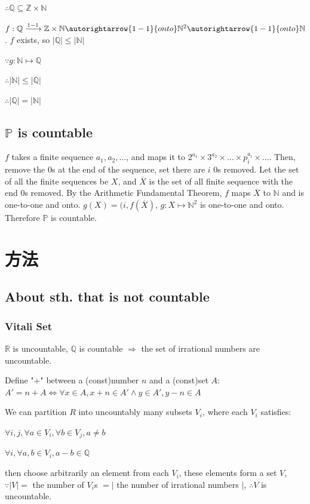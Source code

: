 \documentclass[12pt,a4paper]{ctexrep}
\begin{document}
$\therefore \mathbb{Q} \subseteq \mathbb{Z}\times \mathbb{N}$

$f: \mathbb{Q}\xrightarrow{1-1}\mathbb{Z}\times\mathbb{N}\autorightarrow{1-1}{onto}\mathbb{N}^2\autorightarrow{1-1}{onto}\mathbb{N}$. $f$ exists, so $|\mathbb{Q}|\leqslant|\mathbb{N}|$

$\because g:\mathbb{N}\mapsto \mathbb{Q}$

$\therefore |\mathbb{N}|\leqslant|\mathbb{Q}|$

$\therefore |\mathbb{Q}| = |\mathbb{N}|$
\subsection{$\mathbb{P}$ is countable}
$f$ takes a finite sequence $a_1,a_2,\dots$, and maps it to $2^{a_1}\times3^{a_2}\times\dots\times p_i^{a_i} \times\dots$. Then, remove the 0s at the end of the sequence, set there are $i$ 0s removed. Let the set of all the finite sequences be $X$, and $\overline{X}$ is the set of all finite sequence with the end 0s removed. By the Arithmetic Fundamental Theorem, $f$ maps $\overline{X}$ to $\mathbb{N}$ and is one-to-one and onto. $g(X) = (i,f(\overline{X})$, $g:X \mapsto \mathbb{N}^2$ is one-to-one and onto. Therefore $\mathbb{P}$ is countable.


\section{方法}
\subsection{About sth. that is not countable}
\subsubsection{Vitali Set}
$\mathbb{R}$ is uncountable, $\mathbb{Q}$ is countable $\Rightarrow$ the set of irrational numbers are uncountable.

Define "+" between a (const)number $n$ and a (const)set $A$: $A' = n+A \iff \forall x\in A, x+n \in A' \wedge y \in A', y-n \in A$

We can partition $R$ into uncountably many subsets $V_i$, where each $V_i$ satisfies:

$\forall i,j, \forall a\in V_i, \forall b \in V_j, a \neq b$

$\forall i, \forall a,b \in V_i, a-b \in \mathbb{Q}$

then choose arbitrarily an element from each $V_i$, these elements form a set $V$, $\because |V| = $ the number of $V_i$s $= |$ the number of irrational numbers $|$, $\therefore V $ is uncountable.
\end{document}

